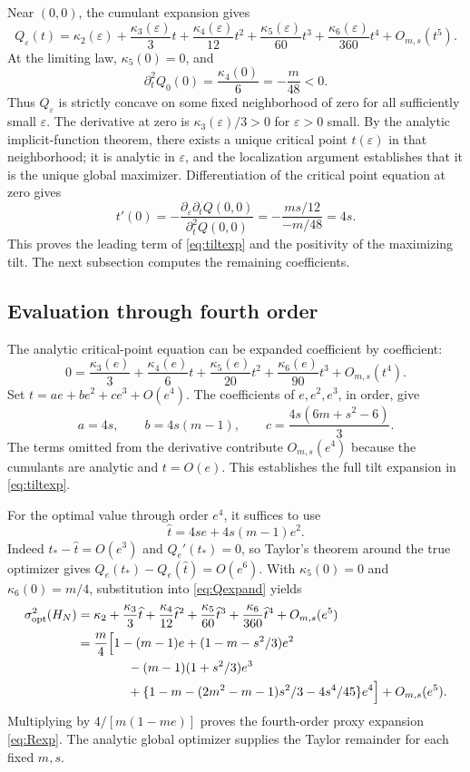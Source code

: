 Near $(0,0)$, the cumulant expansion gives
\begin{equation}\label{eq:Qexpand}
 Q_\varepsilon(t)=\kappa_2(\varepsilon)
 +\frac{\kappa_3(\varepsilon)}3t
 +\frac{\kappa_4(\varepsilon)}{12}t^2
 +\frac{\kappa_5(\varepsilon)}{60}t^3
 +\frac{\kappa_6(\varepsilon)}{360}t^4+O_{m,s}(t^5).
\end{equation}
At the limiting law, $\kappa_5(0)=0$, and
\[
 \partial_t^2Q_0(0)=\frac{\kappa_4(0)}6=-\frac m{48}<0.
\]
Thus $Q_\varepsilon$ is strictly concave on some fixed neighborhood of zero for all sufficiently small $\varepsilon$. The derivative at zero is $\kappa_3(\varepsilon)/3>0$ for $\varepsilon>0$ small. By the analytic implicit-function theorem, there exists a unique critical point $t(\varepsilon)$ in that neighborhood; it is analytic in $\varepsilon$, and the localization argument establishes that it is the unique global maximizer. Differentiation of the critical point equation at zero gives
\[
 t'(0)=-\frac{\partial_\varepsilon\partial_t Q(0,0)}{\partial_t^2Q(0,0)}
 =-\frac{ms/12}{-m/48}=4s.
\]
This proves the leading term of \eqref{eq:tiltexp} and the positivity of the maximizing tilt. The next subsection computes the remaining coefficients.

\subsection{Evaluation through fourth order}
The analytic critical-point equation can be expanded coefficient by coefficient:
\[
 0=\frac{\kappa_3(e)}3+\frac{\kappa_4(e)}6t
 +\frac{\kappa_5(e)}{20}t^2+\frac{\kappa_6(e)}{90}t^3+O_{m,s}(t^4).
\]
Set $t=a e+b e^2+c e^3+O(e^4)$. The coefficients of $e,e^2,e^3$, in order, give
\[
 a=4s,\qquad b=4s(m-1),\qquad c=\frac{4s(6m+s^2-6)}3.
\]
The terms omitted from the derivative contribute $O_{m,s}(e^4)$ because the cumulants are analytic and $t=O(e)$. This establishes the full tilt expansion in \eqref{eq:tiltexp}.

For the optimal value through order $e^4$, it suffices to use
\[
 \widehat t=4se+4s(m-1)e^2.
\]
Indeed $t_* -\widehat t=O(e^3)$ and $Q_e'(t_*)=0$, so Taylor's theorem around the true optimizer gives $Q_e(t_*)-Q_e(\widehat t)=O(e^6)$. With $\kappa_5(0)=0$ and $\kappa_6(0)=m/4$, substitution into \eqref{eq:Qexpand} yields
\begin{align*}
 \sigma^2_{\mathrm{opt}}(H_N)
 &=\kappa_2+\frac{\kappa_3}3\widehat t
 +\frac{\kappa_4}{12}\widehat t^2
 +\frac{\kappa_5}{60}\widehat t^3
 +\frac{\kappa_6}{360}\widehat t^4+O_{m,s}(e^5)\\
 &=\frac m4\Bigl[1-(m-1)e+(1-m-s^2/3)e^2\\
 &\hspace{14mm}-(m-1)(1+s^2/3)e^3\\
 &\hspace{14mm}+\{1-m-(2m^2-m-1)s^2/3-4s^4/45\}e^4\Bigr]
 +O_{m,s}(e^5).
\end{align*}
Multiplying by $4/[m(1-me)]$ proves the fourth-order proxy expansion \eqref{eq:Rexp}. The analytic global optimizer supplies the Taylor remainder for each fixed $m,s$.

